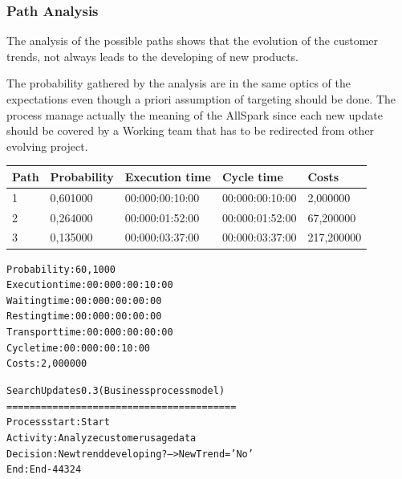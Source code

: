 \subsubsection{Path Analysis}
The analysis of the possible paths shows that the evolution of the customer
trends, not always leads to the developing of new products.

The probability gathered by the analysis are in the same optics of the expectations even though a priori assumption of targeting should be done. The process manage actually the meaning of the AllSpark since each new update should be covered by a Working team that has to be redirected from other evolving project.

\begin{table}[ht!]
\centering
\begin{tabular}{|l|l|l|l|l|}
\hline
Path&Probability&Execution time&Cycle time&Costs\\
\hline
1&0,601000&00:000:00:10:00&00:000:00:10:00&2,000000\\
\hline
2&0,264000&00:000:01:52:00&00:000:01:52:00&67,200000\\
\hline
3&0,135000&00:000:03:37:00&00:000:03:37:00&217,200000\\
\hline
\end{tabular}
\end{table}

\begin{alltt}
Probability:   60,1000%
Execution time:  00:000:00:10:00
Waiting time:  00:000:00:00:00
Resting time:  00:000:00:00:00
Transport time:  00:000:00:00:00
Cycle time:  00:000:00:10:00
Costs:  2,000000

Search Updates 0.3 (Business process model)
========================================
Process start: Start
Activity: Analyze customer usage data
Decision: New trend developing? --> NewTrend = 'No'
End: End-44324
\end{alltt}

